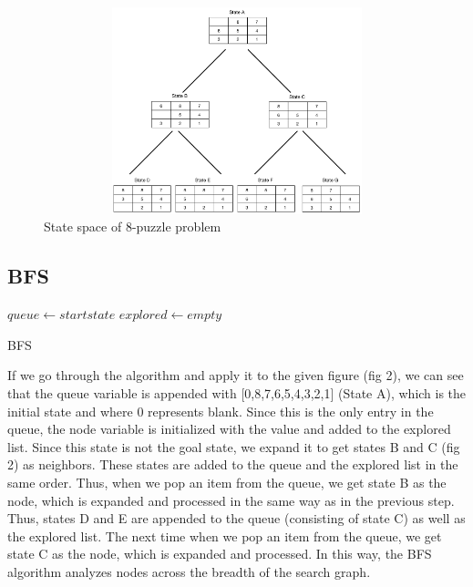 \documentclass{svproc}
\begin{document}
\begin{figure}
	\centering
	\includegraphics[width=12cm,height=6cm,keepaspectratio]{ExampleState.png}
	\caption{State space of 8-puzzle problem}
	\label{fig:2}       %
\end{figure}

\subsection{BFS}

\begin{algorithm}[H]
	\SetAlgoLined
	 $queue \gets start state$\;
	 $explored \gets empty$\;
	\caption{BFS}
\end{algorithm}

\noindent If we go through the algorithm and apply it to the given figure (fig 2), we can see that the queue variable is appended with [0,8,7,6,5,4,3,2,1] (State A), which is the initial state and where 0 represents blank. Since this is the only entry in the queue, the node variable is initialized with the value and added to the explored list. Since this state is not the goal state, we expand it to get states B and C (fig 2) as neighbors. These states are added to the queue and the explored list in the same order. Thus, when we pop an item from the queue, we get state B as the node, which is expanded and processed in the same way as in the previous step. Thus, states D and E are appended to the queue (consisting of state C) as well as the explored list. The next time when we pop an item from the queue, we get state C as the node, which is expanded and processed. In this way, the BFS algorithm analyzes nodes across the breadth of the search graph.
\end{document}
